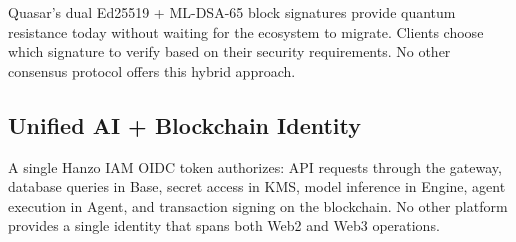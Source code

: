 Quasar's dual Ed25519 + ML-DSA-65 block signatures provide quantum resistance today without waiting for the ecosystem to migrate. Clients choose which signature to verify based on their security requirements. No other consensus protocol offers this hybrid approach.

\subsection{Unified AI + Blockchain Identity}

A single Hanzo IAM OIDC token authorizes: API requests through the gateway, database queries in Base, secret access in KMS, model inference in Engine, agent execution in Agent, and transaction signing on the blockchain. No other platform provides a single identity that spans both Web2 and Web3 operations.

